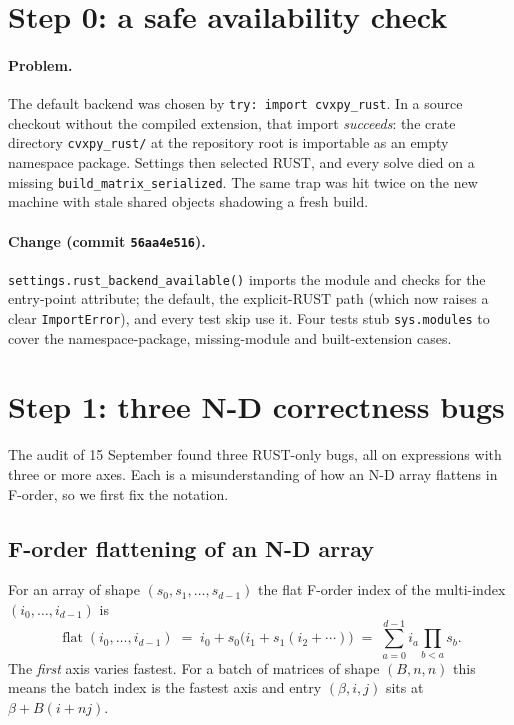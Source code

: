 \documentclass[11pt,a4paper]{article}
\newcommand{\code}[1]{\texttt{#1}}
\begin{document}
\section{Step 0: a safe availability check}
\label{sec:step0}

\paragraph{Problem.} The default backend was chosen by \code{try: import cvxpy\_rust}. In a source
checkout without the compiled extension, that import \emph{succeeds}: the crate directory
\code{cvxpy\_rust/} at the repository root is importable as an empty namespace package. Settings then
selected RUST, and every solve died on a missing \code{build\_matrix\_serialized}. The same trap was hit
twice on the new machine with stale shared objects shadowing a fresh build.

\paragraph{Change (commit \code{56aa4e516}).} \code{settings.rust\_backend\_available()} imports the
module and checks for the entry-point attribute; the default, the explicit-RUST path (which now raises a
clear \code{ImportError}), and every test skip use it. Four tests stub \code{sys.modules} to cover the
namespace-package, missing-module and built-extension cases.

\section{Step 1: three N-D correctness bugs}
\label{sec:step1}

The audit of 15 September found three RUST-only bugs, all on expressions with three or more axes.
Each is a misunderstanding of how an N-D array flattens in F-order, so we first fix the notation.

\subsection{F-order flattening of an N-D array}

For an array of shape $(s_0, s_1, \dots, s_{d-1})$ the flat F-order index of the multi-index
$(i_0, \dots, i_{d-1})$ is
\begin{equation}
  \label{eq:forder}
  \operatorname{flat}(i_0,\dots,i_{d-1}) \;=\; i_0 + s_0\big(i_1 + s_1(i_2 + \cdots)\big)
  \;=\; \sum_{a=0}^{d-1} i_a \prod_{b<a} s_b .
\end{equation}
The \emph{first} axis varies fastest. For a batch of matrices of shape $(B, n, n)$ this means the
batch index is the fastest axis and entry $(\beta, i, j)$ sits at $\beta + B(i + nj)$.
\end{document}
